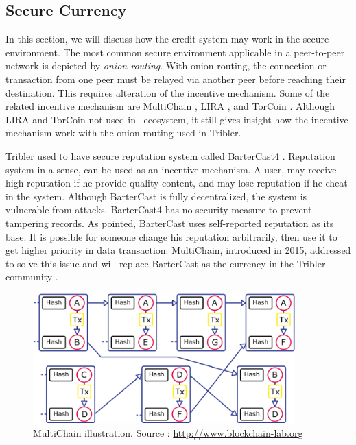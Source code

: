 \subsection{Secure Currency}
\label{section:sec_currency}
In this section, we will discuss how the credit system may work in the secure environment. The most common secure environment applicable in a peer-to-peer network is depicted by \textit{onion routing}. With onion routing, the connection or transaction from one peer must be relayed via another peer before reaching their destination. This requires alteration of the incentive mechanism. Some of the related incentive mechanism are MultiChain \cite{2015:multichain:norberhuis}, LIRA \cite{2013:lira:jansen}, and TorCoin \cite{2014:torcoin:ghosh}. Although LIRA and TorCoin not used in \bt~ecosystem, it still gives insight how the incentive mechanism work with the onion routing used in Tribler.

Tribler used to have secure reputation system called BarterCast4 \cite{2009:bartercast:meulpolder}. Reputation system in a sense, can be used as an incentive mechanism. A user, may receive high reputation if he provide quality content, and may lose reputation if he cheat in the system. Although BarterCast is fully decentralized, the system is vulnerable from attacks. BarterCast4 has no security measure to prevent tampering records. As \citeauthor{2015:multichain:norberhuis} pointed, BarterCast uses self-reported reputation as its base. It is possible for someone change his reputation arbitrarily, then use it to get higher priority in data transaction. MultiChain, introduced in 2015, addressed to solve this issue and will replace BarterCast as the currency in the Tribler community \cite{2015:multichain:norberhuis}. 

\begin{figure}[h]
	\centering
	\includegraphics[width=0.9\textwidth]{pics/blockchain.png}
	\caption{MultiChain illustration. Source : \url{http://www.blockchain-lab.org}}
	\label{fig:multichain}
\end{figure}

